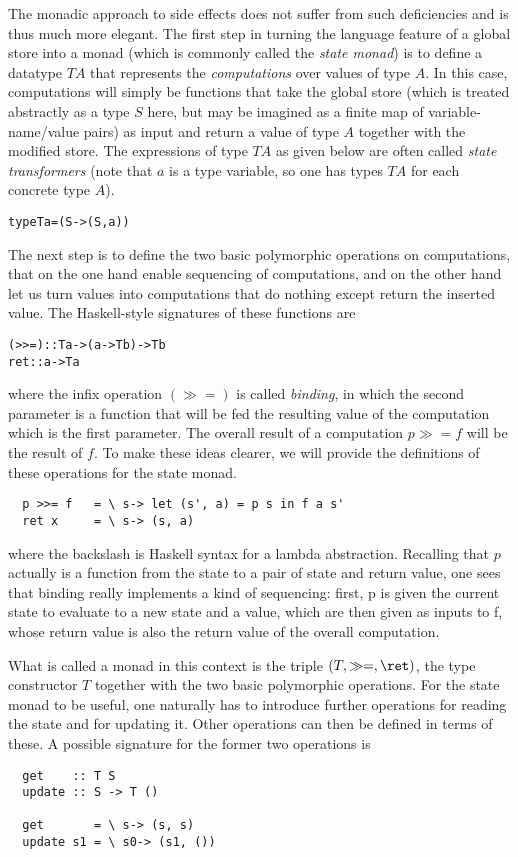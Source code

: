 The monadic approach to side effects does not suffer from such deficiencies and
is thus much more elegant. The first step in turning the language feature of a
global store into a monad (which is commonly called the \emph{state monad}) is
to define a datatype $T A$ that represents the \emph{computations} over values
of type $A$. In this case, computations will simply be functions that take the
global store (which is treated abstractly as a type $S$ here, but may be
imagined as a finite map of variable-name/value pairs) as input and return a
value of type $A$ together with the modified store. The expressions of type $T
A$ as given below are often called \emph{state transformers} (note that $a$ is
a type variable, so one has types $T A$ for each concrete type $A$).
\begin{alltt}
  type T a = (S -> (S, a))
\end{alltt}

The next step is to define the two basic polymorphic operations on computations,
that on the one hand enable sequencing of computations, and on the other hand
let us turn values into computations that do nothing except return the inserted
value. The Haskell-style signatures of these functions are
\begin{alltt}
  (>>=) :: T a -> (a -> T b) -> T b
  ret   :: a -> T a
\end{alltt}
where the infix operation $(\gg=)$ is called \emph{binding}, in which the second
parameter is a function that will be fed the resulting value of the computation
which is the first parameter. The overall result of a computation $p \gg= f$ will
be the result of $f$. To make these ideas clearer, we will provide the definitions
of these operations for the state monad.
\begin{verbatim}
  p >>= f   = \ s-> let (s', a) = p s in f a s'
  ret x     = \ s-> (s, a)
\end{verbatim}
where the backslash is Haskell syntax for a lambda abstraction. Recalling that $p$
actually is a function from the state to a pair of state and return value, one
sees that binding really implements a kind of sequencing: first, p is given the
current state to evaluate to a new state and a value, which are then given as
inputs to f, whose return value is also the return value of the overall
computation.

What is called a monad in this context is the triple $(T, \gg=, \ret)$, \IE the
type constructor $T$ together with the two basic polymorphic operations. For the
state monad to be useful, one naturally has to introduce further operations for
reading the state and for updating it. Other operations can then be defined in
terms of these. A possible signature for the former two operations is
\begin{verbatim}
  get    :: T S
  update :: S -> T ()
 
  get       = \ s-> (s, s)
  update s1 = \ s0-> (s1, ())
\end{verbatim}

